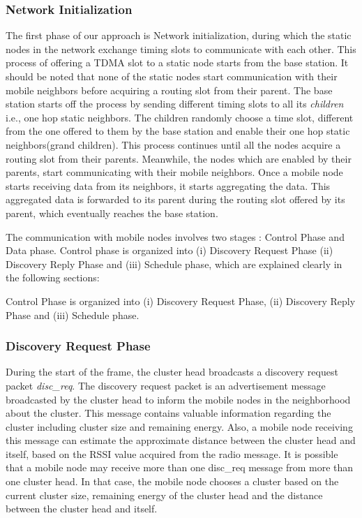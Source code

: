 \subsubsection{Network Initialization}
The first phase of our approach is Network initialization, during which the static nodes in the network exchange timing slots to communicate with each other. This process of offering a TDMA slot to a static node starts from the base station. It should be noted that none of the static nodes start communication with their mobile neighbors before acquiring a routing slot from their parent. The base station starts off the process by sending different timing slots to all its \emph{children} i.e., one hop static neighbors. The children randomly choose a time slot, different from the one offered to them by the base station and enable their one hop static neighbors(grand children). This process continues until all the nodes acquire a routing slot from their parents. Meanwhile, the nodes which are enabled by their parents, start communicating with their mobile neighbors. Once a mobile node starts receiving data from its neighbors, it starts aggregating the data. This aggregated data is forwarded to its parent during the routing slot offered by its parent, which eventually reaches the base station.


The communication with mobile nodes involves two stages : Control Phase and Data phase. Control phase is organized into (i) Discovery Request Phase (ii) Discovery Reply Phase and (iii) Schedule phase, which are explained clearly in the following sections:

Control Phase is organized into (i) Discovery Request Phase, (ii) Discovery Reply Phase and (iii) Schedule phase.

\subsubsection{Discovery Request Phase}
\label{disc_req_phase}
During the start of the frame, the cluster head broadcasts a discovery request packet \emph{disc\_req}. The discovery request packet is an advertisement message broadcasted by the cluster head to inform the mobile nodes in the neighborhood about the cluster. This message contains valuable information regarding the cluster including cluster size and remaining energy. Also, a mobile node receiving this message can estimate the approximate distance between the cluster head and itself, based on the RSSI value acquired from the radio message. It is possible that a mobile node may receive more than one disc\_req message from more than one cluster head. In that case, the mobile node chooses a cluster based on the current cluster size, remaining energy of the cluster head and the distance between the cluster head and itself.

